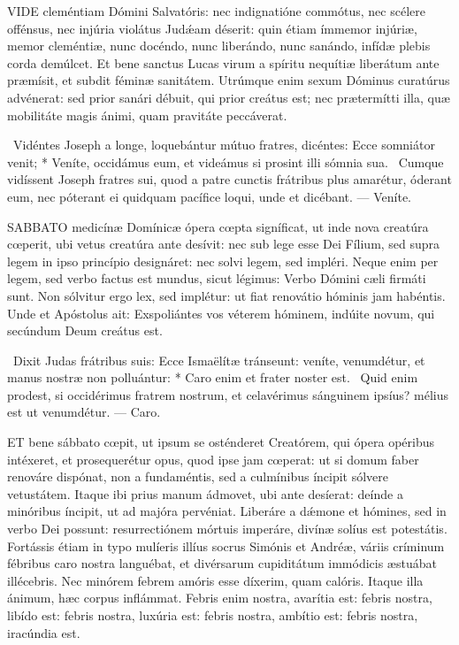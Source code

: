 
\lettrine[lines=2]{V}{IDE} cleméntiam Dómini Salvatóris: nec indignatióne commótus, nec scélere offénsus, nec injúria violátus Judǽam déserit: quin étiam ímmemor injúriæ, memor cleméntiæ, nunc docéndo, nunc liberándo, nunc sanándo, infídæ plebis corda demúlcet. Et bene sanctus Lucas virum a spíritu nequítiæ liberátum ante præmísit, et subdit féminæ sanitátem. Utrúmque enim sexum Dóminus curatúrus advénerat: sed prior sanári débuit, qui prior creátus est; nec prætermítti illa, quæ mobilitáte magis ánimi, quam pravitáte peccáverat.

\R\ Vidéntes Joseph a longe, loquebántur mútuo fratres, dicéntes: Ecce somniátor venit; * Veníte, occidámus eum, et videámus si prosint illi sómnia sua. \V\ Cumque vidíssent Joseph fratres sui, quod a patre cunctis frátribus plus amarétur, óderant eum, nec póterant ei quidquam pacífice loqui, unde et dicébant. --- Veníte.


\lettrine[lines=2]{S}{ABBATO} medicínæ Domínicæ ópera cœpta signíficat, ut inde nova creatúra cœperit, ubi vetus creatúra ante desívit: nec sub lege esse Dei Fílium, sed supra legem in ipso princípio designáret: nec solvi legem, sed impléri. Neque enim per legem, sed verbo factus est mundus, sicut légimus: Verbo Dómini cæli firmáti sunt. Non sólvitur ergo lex, sed implétur: ut fiat renovátio hóminis jam habéntis. Unde et Apóstolus ait: Exspoliántes vos véterem hóminem, indúite novum, qui secúndum Deum creátus est.

\R\ Dixit Judas frátribus suis: Ecce Ismaëlítæ tránseunt: veníte, venumdétur, et manus nostræ non polluántur: * Caro enim et frater noster est. \V\ Quid enim prodest, si occidérimus fratrem nostrum, et celavérimus sánguinem ipsíus? mélius est ut venumdétur. --- Caro.


\lettrine[lines=2]{E}{T} bene sábbato cœpit, ut ipsum se osténderet Creatórem, qui ópera opéribus intéxeret, et prosequerétur opus, quod ipse jam cœperat: ut si domum faber renováre dispónat, non a fundaméntis, sed a culmínibus íncipit sólvere vetustátem. Itaque ibi prius manum ádmovet, ubi ante desíerat: deínde a minóribus íncipit, ut ad majóra pervéniat. Liberáre a dǽmone et hómines, sed in verbo Dei possunt: resurrectiónem mórtuis imperáre, divínæ solíus est potestátis. Fortássis étiam in typo mulíeris illíus socrus Simónis et Andréæ, váriis críminum fébribus caro nostra languébat, et divérsarum cupiditátum immódicis æstuábat illécebris. Nec minórem febrem amóris esse díxerim, quam calóris. Itaque illa ánimum, hæc corpus inflámmat. Febris enim nostra, avarítia est: febris nostra, libído est: febris nostra, luxúria est: febris nostra, ambítio est: febris nostra, iracúndia est.

